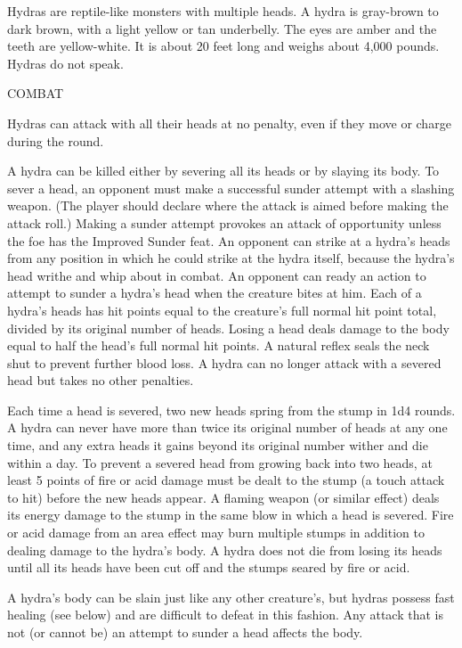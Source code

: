 \documentclass{article}
\begin{document}
Hydras are reptile-like monsters with multiple heads. A hydra is gray-brown to 
dark brown, with a light yellow or tan underbelly. The eyes are amber and the teeth 
are yellow-white. It is about 20 feet long and weighs about 4,000 pounds. Hydras 
do not speak.

COMBAT

Hydras can attack with all their heads at no penalty, even if they move or charge 
during the round.

A hydra can be killed either by severing all its heads or by slaying its body. 
To sever a head, an opponent must make a successful sunder attempt with a slashing 
weapon. (The player should declare where the attack is aimed before making the 
attack roll.) Making a sunder attempt provokes an attack of opportunity unless 
the foe has the Improved Sunder feat. An opponent can strike at a hydra's heads 
from any position in which he could strike at the hydra itself, because the hydra's 
head writhe and whip about in combat. An opponent can ready an action to attempt 
to sunder a hydra's head when the creature bites at him. Each of a hydra's heads 
has hit points equal to the creature's full normal hit point total, divided by 
its original number of heads. Losing a head deals damage to the body equal to half 
the head's full normal hit points. A natural reflex seals the neck shut to prevent 
further blood loss. A hydra can no longer attack with a severed head but takes 
no other penalties.

Each time a head is severed, two new heads spring from the stump in 1d4 rounds. 
A hydra can never have more than twice its original number of heads at any one 
time, and any extra heads it gains beyond its original number wither and die within 
a day. To prevent a severed head from growing back into two heads, at least 5 points 
of fire or acid damage must be dealt to the stump (a touch attack to hit) before 
the new heads appear. A flaming weapon (or similar effect) deals its energy damage 
to the stump in the same blow in which a head is severed. Fire or acid damage from 
an area effect may burn multiple stumps in addition to dealing damage to the hydra's 
body. A hydra does not die from losing its heads until all its heads have been 
cut off and the stumps seared by fire or acid. 

A hydra's body can be slain just like any other creature's, but hydras possess 
fast healing (see below) and are difficult to defeat in this fashion. Any attack 
that is not (or cannot be) an attempt to sunder a head affects the body.
\end{document}

